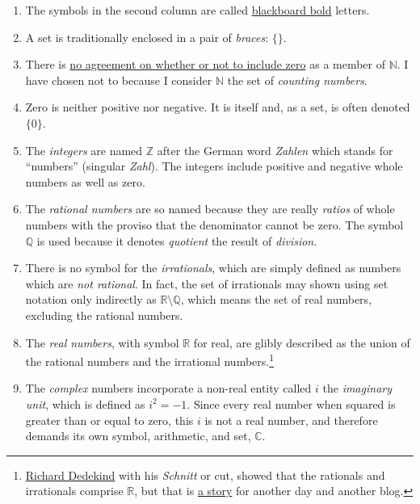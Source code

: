 \documentclass[
  a4paper,
]{article}
\begin{document}
\begin{enumerate}
\item
  The symbols in the second column are called
  \href{https://oeis.org/wiki/Blackboard_bold}{blackboard bold} letters.
\item
  A set is traditionally enclosed in a pair of \emph{braces}: \(\{\}\).
\item
  There is \href{https://en.wikipedia.org/wiki/Natural_number}{no
  agreement on whether or not to include zero} as a member of
  \(\mathbb{N}\). I have chosen not to because I consider \(\mathbb{N}\)
  the set of \emph{counting numbers}.
\item
  Zero is neither positive nor negative. It is itself and, as a set, is
  often denoted \(\{0\}\).
\item
  The \emph{integers} are named \(\mathbb{Z}\) after the German word
  \emph{Zahlen} which stands for ``numbers'' (singular \emph{Zahl}). The
  integers include positive and negative whole numbers as well as zero.
\item
  The \emph{rational numbers} are so named because they are really
  \emph{ratios} of whole numbers with the proviso that the denominator
  cannot be zero. The symbol \(\mathbb{Q}\) is used because it denotes
  \emph{quotient} the result of \emph{division}.
\item
  There is no symbol for the \emph{irrationals}, which are simply
  defined as numbers which are \emph{not rational}. In fact, the set of
  irrationals may shown using set notation only indirectly as
  \(\mathbb{R}\setminus\mathbb{Q}\), which means the set of real
  numbers, excluding the rational numbers.
\item
  The \emph{real numbers}, with symbol \(\mathbb{R}\) for real, are
  glibly described as the union of the rational numbers and the
  irrational numbers.\footnote{\href{https://en.wikipedia.org/wiki/Richard_Dedekind}{Richard
    Dedekind} with his \emph{Schnitt} or cut, showed that the rationals
    and irrationals comprise \(\mathbb{R}\), but that is
    \href{https://arpita95b.medium.com/cutting-through-the-confusion-how-dedekind-cuts-build-the-real-numbers-20aeaaec021d}{a
    story} for another day and another blog.}
\item
  The \emph{complex} numbers incorporate a non-real entity called \(i\)
  the \emph{imaginary unit}, which is defined as \(i^2 = -1\). Since
  every real number when squared is greater than or equal to zero, this
  \(i\) is not a real number, and therefore demands its own symbol,
  arithmetic, and set, \(\mathbb{C}\).
\end{enumerate}
\end{document}
